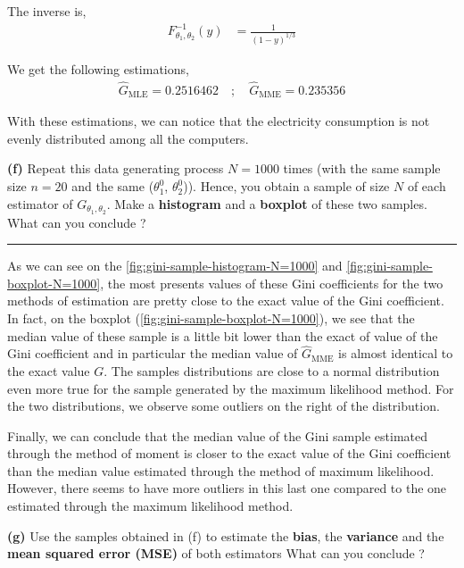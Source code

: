The inverse is, 
\begin{align*}
  F^{-1}_{\theta_1, \theta_2}(y) 
    &= \frac{1}{(1-y)^{1/3}}
\end{align*}

We get the following estimations,
\begin{equation}
  \begin{array}{rl}
    \hat{G}_{\text{MLE}} = 0.2516462 \quad ; \quad \hat{G}_{\text{MME}} = 0.235356
  \end{array}
\end{equation}

With these estimations, we can notice that the electricity consumption is not evenly distributed among all the computers. 

\textbf{(f)} Repeat this data generating process $N = 1000$ times (with the same sample size $n = 20$ and the same ($\theta_1^0$, $\theta_2^0$)). Hence, you obtain a sample of size $N$ of each estimator of $G_{\theta_1, \theta_2}$. Make a \textbf{histogram} and a \textbf{boxplot} of these two samples. What can you conclude ?

\begin{center}\rule{6cm}{0.4pt}\end{center}

As we can see on the \autoref{fig:gini-sample-histogram-N=1000} and \autoref{fig:gini-sample-boxplot-N=1000}, the most presents values of these Gini coefficients for the two methods of estimation are pretty close to the exact value of the Gini coefficient. In fact, on the boxplot (\autoref{fig:gini-sample-boxplot-N=1000}), we see that the median value of these sample is a little bit lower than the exact of value of the Gini coefficient and in particular the median value of $\hat{G}_{\text{MME}}$ is almost identical to the exact value $G$. The samples distributions are close to a normal distribution even more true for the sample generated by the maximum likelihood method. For the two distributions, we observe some outliers on the right of the distribution.

Finally, we can conclude that the median value of the Gini sample estimated through the method of moment is closer to the exact value of the Gini coefficient than the median value estimated through the method of maximum likelihood. However, there seems to have more outliers in this last one compared to the one estimated through the maximum likelihood method.

\textbf{(g)} Use the samples obtained in (f) to estimate the \textbf{bias}, the \textbf{variance} and the \textbf{mean squared error (MSE)} of both estimators What can you conclude ?

